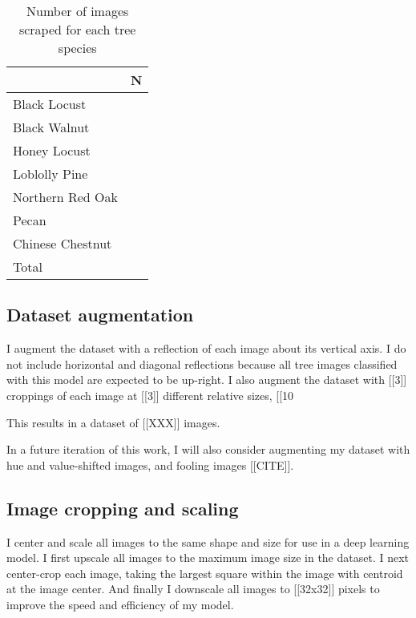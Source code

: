 \documentclass[10pt,twocolumn,letterpaper]{article}
\begin{document}
\begin{table}
\begin{center}
\begin{tabular}{|l|c|}
\hline
& N \\
\hline\hline
Black Locust & \\
Black Walnut & \\
Honey Locust & \\
Loblolly Pine & \\
Northern Red Oak & \\
Pecan & \\
Chinese Chestnut & \\
\hline\hline
Total & \\
\hline
\end{tabular}
\end{center}
\caption{Number of images scraped for each tree species}
\end{table}

\subsection{Dataset augmentation}

I augment the dataset with a reflection of each image about its vertical axis. I do not include horizontal and diagonal reflections because all tree images classified with this model are expected to be up-right. I also augment the dataset with [[3]] croppings of each image at [[3]] different relative sizes, [[10%

This results in a dataset of [[XXX]] images.

In a future iteration of this work, I will also consider augmenting my dataset with hue and value-shifted images, and fooling images [[CITE]].

\subsection{Image cropping and scaling}

I center and scale all images to the same shape and size for use in a deep learning model. I first upscale all images to the maximum image size in the dataset. I next center-crop each image, taking the largest square within the image with centroid at the image center. And finally I downscale all images to [[32x32]] pixels to improve the speed and efficiency of my model.
\end{document}
